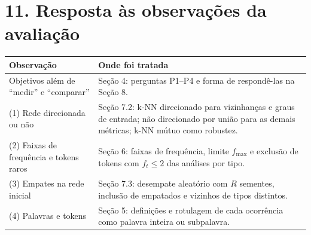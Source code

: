 \documentclass[11pt,a4paper]{article}
\begin{document}
\section*{11. Resposta às observações da avaliação}

\begin{center}
\small
\begin{tabularx}{\textwidth}{@{}lX@{}}
\toprule
\textbf{Observação} & \textbf{Onde foi tratada} \\
\midrule
Objetivos além de ``medir'' e ``comparar'' &
Seção 4: perguntas P1--P4 e forma de respondê-las na Seção 8. \\
(1) Rede direcionada ou não &
Seção 7.2: k-NN direcionado para vizinhanças e graus de entrada;
não direcionado por união para as demais métricas; k-NN mútuo como robustez. \\
(2) Faixas de frequência e tokens raros &
Seção 6: faixas de frequência, limite $f_{\max}$ e exclusão de
tokens com $f_t\le 2$ das análises por tipo. \\
(3) Empates na rede inicial &
Seção 7.3: desempate aleatório com $R$ sementes, inclusão de empatados e
vizinhos de tipos distintos. \\
(4) Palavras e tokens &
Seção 5: definições e rotulagem de cada ocorrência como palavra inteira ou
subpalavra. \\
\bottomrule
\end{tabularx}
\end{center}
\end{document}
